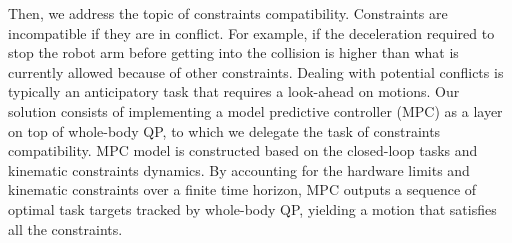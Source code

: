 \noindent
Then, we address the topic of constraints compatibility. Constraints are incompatible if they are in conflict. For example, if the deceleration required to stop the robot arm before getting into the collision is higher than what is currently allowed because of other constraints. Dealing with potential conflicts is typically an anticipatory task that requires a look-ahead on motions. Our solution consists of implementing a model predictive controller (MPC) as a layer on top of whole-body QP, to which we delegate the task of constraints compatibility. MPC model is constructed based on the closed-loop tasks and kinematic constraints dynamics. By accounting for the hardware limits and kinematic constraints over a finite time horizon, MPC outputs a sequence of optimal task targets tracked by whole-body QP, yielding a motion that satisfies all the constraints.  



